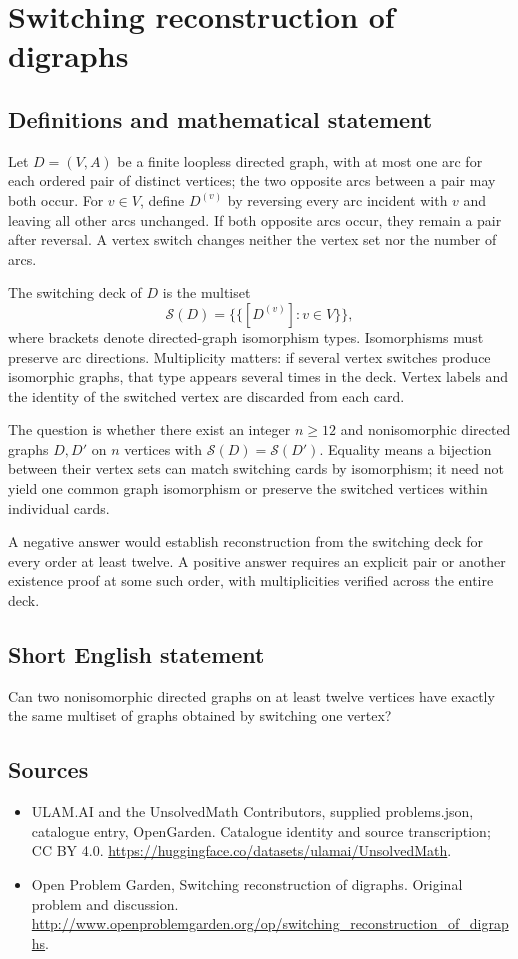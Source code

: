 \documentclass[11pt,a4paper]{article}
\begin{document}
\section*{Switching reconstruction of digraphs}\label{statement}

\subsection{Definitions and mathematical statement}
Let $D=(V,A)$ be a finite loopless directed graph, with at most one arc for each ordered pair of distinct vertices; the two opposite arcs between a pair may both occur. For $v\in V$, define $D^{(v)}$ by reversing every arc incident with $v$ and leaving all other arcs unchanged. If both opposite arcs occur, they remain a pair after reversal. A vertex switch changes neither the vertex set nor the number of arcs.

The switching deck of $D$ is the multiset
\[
 \mathcal S(D)=\{\!\{[D^{(v)}]:v\in V\}\!\},
\]
where brackets denote directed-graph isomorphism types. Isomorphisms must preserve arc directions. Multiplicity matters: if several vertex switches produce isomorphic graphs, that type appears several times in the deck. Vertex labels and the identity of the switched vertex are discarded from each card.

The question is whether there exist an integer $n\ge12$ and nonisomorphic directed graphs $D,D'$ on $n$ vertices with $\mathcal S(D)=\mathcal S(D')$. Equality means a bijection between their vertex sets can match switching cards by isomorphism; it need not yield one common graph isomorphism or preserve the switched vertices within individual cards.

A negative answer would establish reconstruction from the switching deck for every order at least twelve. A positive answer requires an explicit pair or another existence proof at some such order, with multiplicities verified across the entire deck.
\subsection{Short English statement}
Can two nonisomorphic directed graphs on at least twelve vertices have exactly the same multiset of graphs obtained by switching one vertex?
\subsection{Sources}
\begin{itemize}
\item[S1] ULAM.AI and the UnsolvedMath Contributors, supplied problems.json, catalogue entry, OpenGarden. Catalogue identity and source transcription; CC BY 4.0.
\url{https://huggingface.co/datasets/ulamai/UnsolvedMath}.
\item[S2] Open Problem Garden, Switching reconstruction of digraphs. Original problem and discussion.
\url{http://www.openproblemgarden.org/op/switching_reconstruction_of_digraphs}.
\end{itemize}
\end{document}
